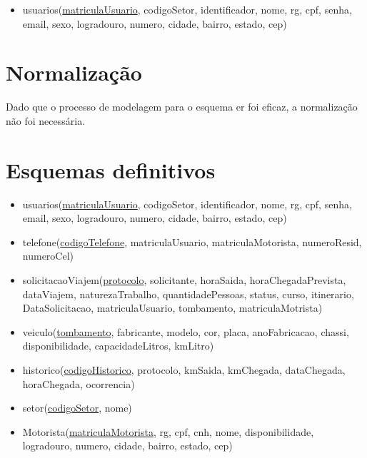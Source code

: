 \documentclass[11pt]{article}
\begin{document}
\begin{itemize}

\item usuarios(\underline{matriculaUsuario}, codigoSetor, identificador, nome, rg, cpf, senha,
email, sexo, logradouro, numero, cidade, bairro, estado, cep)

\end{itemize}

\section{Normalização}
Dado que o processo de modelagem para o esquema er foi eficaz, a normalização não foi necessária.

\section{Esquemas definitivos}
\begin{itemize}

\item usuarios(\underline{matriculaUsuario}, codigoSetor, identificador, nome, rg, cpf, senha, email, sexo, logradouro, numero, cidade, bairro, estado, cep)

\item telefone(\underline{codigoTelefone}, matriculaUsuario, matriculaMotorista, numeroResid, numeroCel)

\item solicitacaoViajem(\underline{protocolo}, solicitante, horaSaida, horaChegadaPrevista, dataViajem, naturezaTrabalho, quantidadePessoas, status, curso, itinerario, DataSolicitacao, matriculaUsuario, tombamento, matriculaMotrista)

\item veiculo(\underline{tombamento}, fabricante, modelo, cor, placa, anoFabricacao, chassi, disponibilidade, capacidadeLitros, kmLitro)

\item historico(\underline{codigoHistorico}, protocolo, kmSaida, kmChegada, dataChegada, horaChegada, ocorrencia)

\item setor(\underline{codigoSetor}, nome)

\item Motorista(\underline{matriculaMotorista}, rg, cpf, cnh, nome, disponibilidade, logradouro, numero, cidade, bairro, estado, cep)

\end{itemize}
\end{document}
